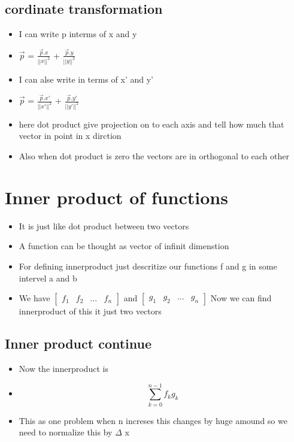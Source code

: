 \documentclass[11pt]{article}
\begin{document}
\subsection{cordinate transformation}
\label{sec:orgdba758f}
\begin{itemize}
\item I can write p interms of x and y
\item \(\vec p\) = \(\frac{\vec p . x}{||x||^2}\) + \(\frac{\vec p . y }{||y||^2}\)
\item I can alse write in terms of x' and y'
\item \(\vec p\) = \(\frac{\vec p . x'}{||x'||^2}\) + \(\frac{\vec p . y' }{||y'||^2}\)
\item here dot product give projection on to each axis and tell how much that vector in point in x dirction
\item Also when dot product is zero the vectors are in orthogonal to each other
\end{itemize}
\section{Inner product of functions}
\label{sec:org471aeb0}
\begin{itemize}
\item It is just like dot product between two vectors
\item A function can be thought as vector of infinit dimenstion
\item For defining innerproduct just descritize our functions f and g in some intervel a and b
\item We have \(\begin{bmatrix}f_1 & f_2 & \ldots & f_n \end{bmatrix}\) and 
\(\begin{bmatrix}g_1 & g_2 & \ldots & g_n \end{bmatrix}\) Now we can find innerproduct of this it just two vectors
\end{itemize}
\subsection{Inner product continue}
\label{sec:org2f9a315}
\begin{itemize}
\item Now the innerproduct is
\item \[\sum_{k=0}^{n-1} f_kg_k\]
\item This as one problem when n increses this changes by huge amound so we need to normalize this by \(\Delta\) x
\end{itemize}
\end{document}
